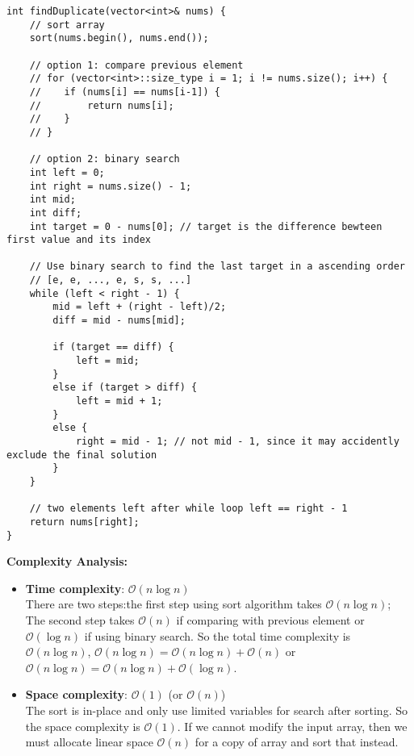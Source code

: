\documentclass[justified]{tufte-book}
\begin{document}
\begin{lstlisting}
int findDuplicate(vector<int>& nums) {
    // sort array
    sort(nums.begin(), nums.end()); 
    
    // option 1: compare previous element
    // for (vector<int>::size_type i = 1; i != nums.size(); i++) {
    //    if (nums[i] == nums[i-1]) {
    //        return nums[i];
    //    }
    // }
    
    // option 2: binary search
    int left = 0;
    int right = nums.size() - 1;
    int mid;
    int diff;
    int target = 0 - nums[0]; // target is the difference bewteen first value and its index
    
    // Use binary search to find the last target in a ascending order 
    // [e, e, ..., e, s, s, ...]
    while (left < right - 1) {
        mid = left + (right - left)/2;
        diff = mid - nums[mid];
        
        if (target == diff) {
            left = mid;
        }
        else if (target > diff) {
            left = mid + 1; 
        }
        else {
            right = mid - 1; // not mid - 1, since it may accidently exclude the final solution
        }
    }
    
    // two elements left after while loop left == right - 1
    return nums[right];  
}  
\end{lstlisting}

\noindent \textbf{Complexity Analysis:}
\begin{itemize}
    \item \textbf{Time complexity}: $\mathcal{O}(n\log n)$ \\
    There are two steps:the first step using sort algorithm takes $\mathcal{O}(n\log n)$; The second step takes $\mathcal{O}(n)$ if comparing with previous element or $\mathcal{O}(\log n)$ if using binary search.  So the total time complexity is $\mathcal{O}(n\log n)$, $\mathcal{O}(n\log n)= \mathcal{O}(n\log n) + \mathcal{O}(n)$ or $\mathcal{O}(n\log n) = \mathcal{O}(n\log n) + \mathcal{O}(\log n)$.
    \item \textbf{Space complexity}: $\mathcal{O}(1)$ (or $\mathcal{O}(n)$) \\
    The sort is in-place and only use limited variables for search after sorting. So the space complexity is $\mathcal{O}(1)$. If we cannot modify the input array, then we must allocate linear space $\mathcal{O}(n)$ for a copy of array and sort that instead.
\end{itemize}
\end{document}
